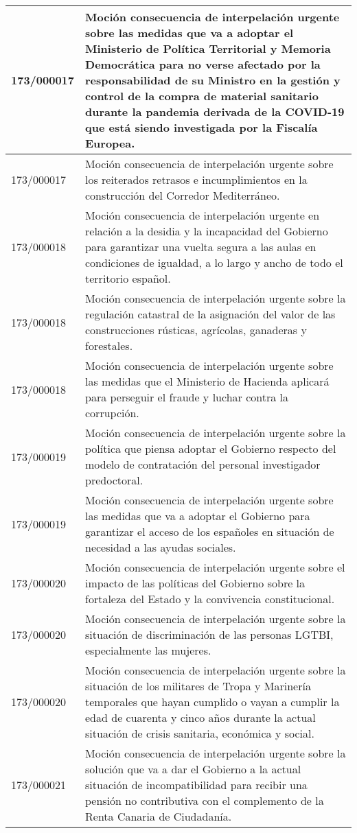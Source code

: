 {\begin{table}[H]
\begin{center}
\begin{tabularx}{\linewidth}{| l | X |}
\hline
173/000017 & Moción consecuencia de interpelación urgente sobre las medidas que va a adoptar el Ministerio de Política Territorial y Memoria Democrática para no verse afectado por la responsabilidad de su Ministro en la gestión y control de la compra de material sanitario durante la pandemia derivada de la COVID-19 que está siendo investigada por la Fiscalía Europea. \\
\hline
173/000017 & Moción consecuencia de interpelación urgente sobre los reiterados retrasos e incumplimientos en la construcción del Corredor Mediterráneo. \\
\hline
173/000018 & Moción consecuencia de interpelación urgente en relación a la desidia y la incapacidad del Gobierno para garantizar una vuelta segura a las aulas en condiciones de igualdad, a lo largo y ancho de todo el territorio español. \\
\hline
173/000018 & Moción consecuencia de interpelación urgente sobre la regulación catastral de la asignación del valor de las construcciones rústicas, agrícolas, ganaderas y forestales. \\
\hline
173/000018 & Moción consecuencia de interpelación urgente sobre las medidas que el Ministerio de Hacienda aplicará para perseguir el fraude y luchar contra la corrupción. \\
\hline
173/000019 & Moción consecuencia de interpelación urgente sobre la política que piensa adoptar el Gobierno respecto del modelo de contratación del personal investigador predoctoral. \\
\hline
173/000019 & Moción consecuencia de interpelación urgente sobre las medidas que va a adoptar el Gobierno para garantizar el acceso de los españoles en situación de necesidad a las ayudas sociales. \\
\hline
173/000020 & Moción consecuencia de interpelación urgente sobre el impacto de las políticas del Gobierno sobre la fortaleza del Estado y la convivencia constitucional. \\
\hline
173/000020 & Moción consecuencia de interpelación urgente sobre la situación de discriminación de las personas LGTBI, especialmente las mujeres. \\
\hline
173/000020 & Moción consecuencia de interpelación urgente sobre la situación de los militares de Tropa y Marinería temporales que hayan cumplido o vayan a cumplir la edad de cuarenta y cinco años durante la actual situación de crisis sanitaria, económica y social. \\
\hline
173/000021 & Moción consecuencia de interpelación urgente sobre la solución que va a dar el Gobierno a la actual situación de incompatibilidad para recibir una pensión no contributiva con el complemento de la Renta Canaria de Ciudadanía. \\

\end{tabularx}
\end{center}
\end{table}}
